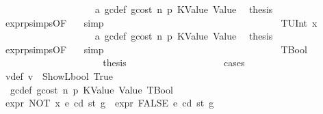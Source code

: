 \begin{isabellebody}
\ \ \ \ \ \ \ \ \ \ \ \ \ \ \ \ \ \ \isamarkupfalse%
\ a{}\ gc{\isacharunderscore}{\kern0pt}def\ gcost\ n\ p{}\ KValue\ Value\ \isamarkupfalse%
\ {\isacharquery}{\kern0pt}thesis\ \isamarkupfalse%
\ expr{\isachardot}{\kern0pt}psimps{\isacharparenleft}{\kern0pt}{}{}{\isacharparenright}{\kern0pt}{\isacharbrackleft}{\kern0pt}OF\ {}{}{\isacharparenleft}{\kern0pt}{}{\isacharparenright}{\kern0pt}{\isacharbrackright}{\kern0pt}\ \isamarkupfalse%
\ simp\isanewline
\ \ \ \ \ \ \ \ \ \ \ \ \ \ \ \ \isamarkupfalse%
\isanewline
\ \ \ \ \ \ \ \ \ \ \ \ \ \ \ \ \ \ \isamarkupfalse%
\ {\isacharparenleft}{\kern0pt}TUInt\ x{}{\isacharparenright}{\kern0pt}\isanewline
\ \ \ \ \ \ \ \ \ \ \ \ \ \ \ \ \ \ \isamarkupfalse%
\ a{}\ gc{\isacharunderscore}{\kern0pt}def\ gcost\ n\ p{}\ KValue\ Value\ \isamarkupfalse%
\ {\isacharquery}{\kern0pt}thesis\ \isamarkupfalse%
\ expr{\isachardot}{\kern0pt}psimps{\isacharparenleft}{\kern0pt}{}{}{\isacharparenright}{\kern0pt}{\isacharbrackleft}{\kern0pt}OF\ {}{}{\isacharparenleft}{\kern0pt}{}{\isacharparenright}{\kern0pt}{\isacharbrackright}{\kern0pt}\ \isamarkupfalse%
\ simp\isanewline
\ \ \ \ \ \ \ \ \ \ \ \ \ \ \ \ \isamarkupfalse%
\isanewline
\ \ \ \ \ \ \ \ \ \ \ \ \ \ \ \ \ \ \isamarkupfalse%
\ TBool\isanewline
\ \ \ \ \ \ \ \ \ \ \ \ \ \ \ \ \ \ \isamarkupfalse%
\ \isamarkupfalse%
\ {\isacharquery}{\kern0pt}thesis\isanewline
\ \ \ \ \ \ \ \ \ \ \ \ \ \ \ \ \ \ \isamarkupfalse%
\ {\isacharparenleft}{\kern0pt}cases{\isacharparenright}{\kern0pt}\isanewline
\ \ \ \ \ \ \ \ \ \ \ \ \ \ \ \ \ \ \ \ \isamarkupfalse%
\ v{\isacharunderscore}{\kern0pt}def{\isacharcolon}{\kern0pt}\ {\isachardoublequoteopen}v\ {\isacharequal}{\kern0pt}\ ShowL\isactrlsub b\isactrlsub o\isactrlsub o\isactrlsub l\ True{\isachardoublequoteclose}\isanewline
\ \ \ \ \ \ \ \ \ \ \ \ \ \ \ \ \ \ \ \ \isamarkupfalse%
\ {}{}{\isacharparenleft}{\kern0pt}{}{\isacharparenright}{\kern0pt}\ gc{\isacharunderscore}{\kern0pt}def\ gcost\ n\ p{}\ KValue\ Value\ TBool\ \isamarkupfalse%
\ {\isachardoublequoteopen}expr\ {\isacharparenleft}{\kern0pt}NOT\ x{\isacharparenright}{\kern0pt}\ e\ cd\ st\ g\ {\isacharequal}{\kern0pt}\ expr\ FALSE\ e\ cd\ st\ g{\isacharprime}{\kern0pt}\ {\isachardoublequoteclose}\ \isamarkupfalse%

\end{isabellebody}

